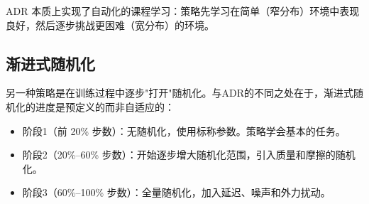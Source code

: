 ADR 本质上实现了自动化的课程学习：策略先学习在简单（窄分布）环境中表现良好，然后逐步挑战更困难（宽分布）的环境。

\subsection{渐进式随机化}

另一种策略是在训练过程中逐步"打开"随机化。与ADR的不同之处在于，渐进式随机化的进度是预定义的而非自适应的：

\begin{itemize}
    \item 阶段1（前 20\% 步数）：无随机化，使用标称参数。策略学会基本的任务。
    \item 阶段2（20\%--60\% 步数）：开始逐步增大随机化范围，引入质量和摩擦的随机化。
    \item 阶段3（60\%--100\% 步数）：全量随机化，加入延迟、噪声和外力扰动。
\end{itemize}


